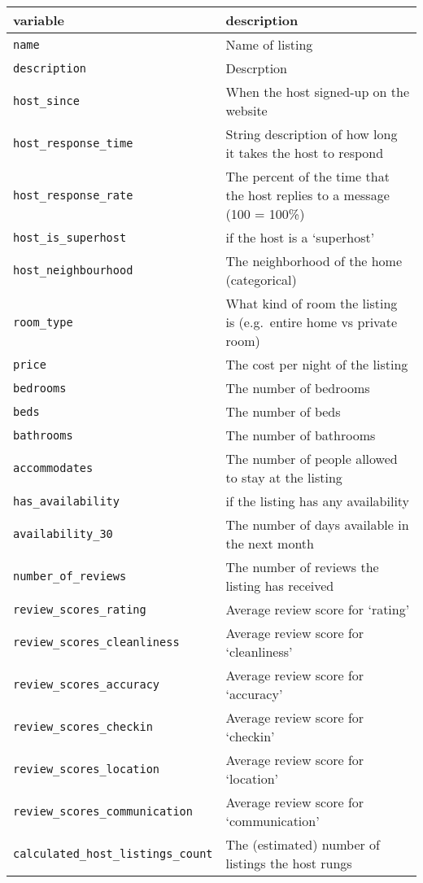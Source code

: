 \documentclass[12pt]{article}
\begin{document}
\begin{longtable}[]{@{}
  >{\raggedright\arraybackslash}p{}
  >{\raggedright\arraybackslash}p{}@{}}
\toprule\noalign{}
\begin{minipage}[b]{\linewidth}\raggedright
variable
\end{minipage} & \begin{minipage}[b]{\linewidth}\raggedright
description
\end{minipage} \\
\midrule\noalign{}
\endhead
\bottomrule\noalign{}
\endlastfoot
\texttt{name} & Name of listing \\
\texttt{description} & Descrption \\
\texttt{host\_since} & When the host signed-up on the website \\
\texttt{host\_response\_time} & String description of how long it takes
the host to respond \\
\texttt{host\_response\_rate} & The percent of the time that the host
replies to a message (100 = 100\%) \\
\texttt{host\_is\_superhost} & =1 if the host is a `superhost' \\
\texttt{host\_neighbourhood} & The neighborhood of the home
(categorical) \\
\texttt{room\_type} & What kind of room the listing is (e.g.~entire home
vs private room) \\
\texttt{price} & The cost per night of the listing \\
\texttt{bedrooms} & The number of bedrooms \\
\texttt{beds} & The number of beds \\
\texttt{bathrooms} & The number of bathrooms \\
\texttt{accommodates} & The number of people allowed to stay at the
listing \\
\texttt{has\_availability} & =1 if the listing has any availability \\
\texttt{availability\_30} & The number of days available in the next
month \\
\texttt{number\_of\_reviews} & The number of reviews the listing has
received \\
\texttt{review\_scores\_rating} & Average review score for `rating' \\
\texttt{review\_scores\_cleanliness} & Average review score for
`cleanliness' \\
\texttt{review\_scores\_accuracy} & Average review score for
`accuracy' \\
\texttt{review\_scores\_checkin} & Average review score for `checkin' \\
\texttt{review\_scores\_location} & Average review score for
`location' \\
\texttt{review\_scores\_communication} & Average review score for
`communication' \\
\texttt{calculated\_host\_listings\_count} & The (estimated) number of
listings the host rungs \\
\end{longtable}
\end{document}
